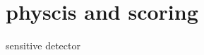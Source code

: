 \documentclass[11pt,compress,xcolor=x11names,UTF8]{beamer}
\begin{document}
\section{physcis and scoring}
\begin{frame}{sensitive detector}
\end{frame}
\end{document}
